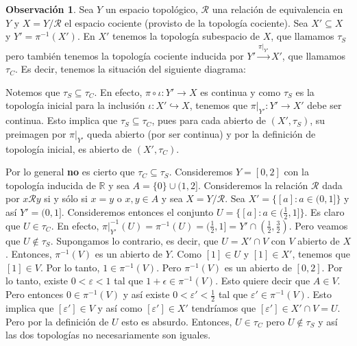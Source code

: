 \documentclass[12pt]{book}
\theoremstyle{definition}
\newtheorem{obs}[teo]{Observación}
\newcommand{\RR}{\mathbb{R}}      %
\newcommand{\Rel}{\mathscr{R}}
\begin{document}
\begin{obs}
Sea $Y$ un espacio topológico, $\Rel$ una relación de equivalencia en $Y$ y $X=Y/\Rel$ el espacio cociente (provisto de la topología cociente). Sea $X'\subseteq X$ y $Y'=\pi^{-1}(X')$. En $X'$ tenemos la topología subespacio de $X$, que llamamos $\tau_S$ pero también tenemos la topología cociente inducida por $Y'\stackrel{\left.\pi\right|_{Y'}}{\longrightarrow} X'$, que llamamos $\tau_C$. Es decir, tenemos la situación del siguiente diagrama: \begin{center}
\end{center}

Notemos que $\tau_S\subseteq \tau_C$. En efecto, $\pi\circ \iota : Y'\to X$ es continua y como $\tau_S$ es la topología inicial para la inclusión $\iota:X'\hookrightarrow X$, tenemos que $\left.\pi\right|_{Y'}:Y'\to X'$ debe ser continua. Esto implica que $\tau_S\subseteq \tau_C$, pues para cada abierto de $(X',\tau_S)$, su preimagen por $\left.\pi\right|_{Y'}$ queda abierto (por ser continua) y por la definición de topología inicial, es abierto de $(X',\tau_C)$.

Por lo general \textbf{no} es cierto que $\tau_C\subseteq \tau_S$. Consideremos $Y=[0,2]$ con la topología inducida de $\RR$ y sea $A=\{0\} \cup (1,2]$. Consideremos la relación $\Rel$ dada por $x\Rel y$ si y sólo si $x=y$ o $x,y\in A$ y sea $X=Y/\Rel$. Sea $X' =\{[a] : a\in (0,1]\}$ y así $Y' = (0,1]$. Consideremos entonces el conjunto $U=\{[a]:a\in (\frac{1}{2},1]\}$. Es claro que $U\in \tau_C$. En efecto, $\left.\pi\right|_{Y'}^{-1}(U)=\pi^{-1}(U) = (\frac{1}{2},1] = Y' \cap (\frac{1}{2},\frac{3}{2})$. Pero veamos que $U\notin \tau_S$. Supongamos lo contrario, es decir, que $U=X'\cap V$ con $V$ abierto de $X$. Entonces, $\pi^{-1}(V)$ es un abierto de $Y$. Como $[1]\in U$ y $[1]\in X'$, tenemos que $[1]\in V$. Por lo tanto, $1\in \pi^{-1}(V)$. Pero $\pi^{-1}(V)$ es un abierto de $[0,2]$. Por lo tanto, existe $0<\varepsilon<1$ tal que $1+\epsilon \in \pi^{-1}(V)$. Esto quiere decir que $A\in V$. Pero entonces $0\in\pi^{-1}(V)$ y así existe $0<\varepsilon'<\frac{1}{2}$ tal que $\varepsilon'\in\pi^{-1}(V)$. Esto implica que $[\varepsilon']\in V$ y así como $[\varepsilon']\in X'$ tendríamos que $[\varepsilon']\in X'\cap V = U$. Pero por la definición de $U$ esto es absurdo. Entonces, $U\in \tau_C$ pero $U\notin\tau_S$ y así las dos topologías no necesariamente son iguales.


\end{obs}
\end{document}
